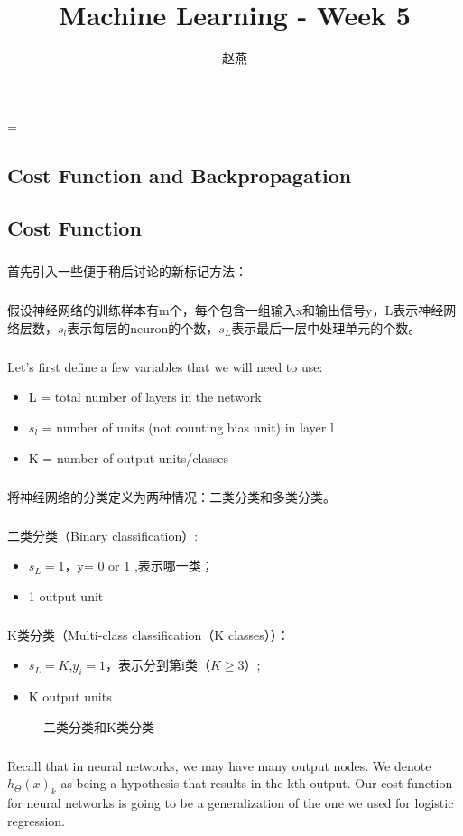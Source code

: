 \documentclass{article}
\title{Machine Learning - Week 5}
\author{赵燕}
\date{}
\begin{document}
 
\hfuzz=\maxdimen
{}
\begin{CJK}{UTF8}{gbsn} 
\maketitle
\renewcommand\contentsname{目录}
\renewcommand\figurename{图}
\tableofcontents
\newpage

\section{Cost Function and Backpropagation}
\subsection{Cost Function}
\subparagraph{}
首先引入一些便于稍后讨论的新标记方法：
\subparagraph{}
假设神经网络的训练样本有m个，每个包含一组输入x和输出信号y，L表示神经网络层数，$s_l$表示每层的neuron的个数，$s_L$表示最后一层中处理单元的个数。
\subparagraph{}
Let's first define a few variables that we will need to use:
\begin{itemize}
 \item L = total number of layers in the network
 \item $s_l$ = number of units (not counting bias unit) in layer l
 \item K = number of output units/classes
\end{itemize}
\subparagraph{}
将神经网络的分类定义为两种情况：二类分类和多类分类。
\subparagraph{}
二类分类（Binary classification）:
\begin{itemize}
  \item $s_L=1$，y= 0 or 1 ,表示哪一类；
  \item 1 output unit
\end{itemize}
\subparagraph{}
K类分类（Multi-class classification（K classes））：
\begin{itemize}
  \item $s_L=K$,$y_i=1$，表示分到第i类（$K\geqslant3$）;
  \item K output units
\end{itemize}
\begin{figure}[H]
\caption{二类分类和K类分类}
\label{fig:502}
\end{figure}
\subparagraph{}
Recall that in neural networks, we may have many output nodes. We denote $h_\Theta{(x)}_k$ as being a hypothesis that results in the kth output. Our cost function for neural networks is going to be a generalization of the one we used for logistic regression.

\end{CJK}
\end{document}
